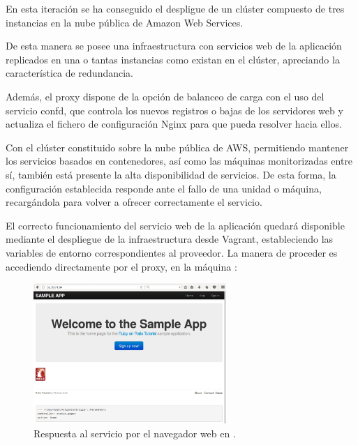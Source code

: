 En esta iteración se ha conseguido el despligue de un clúster compuesto de tres instancias en la nube pública de Amazon Web Services.

De esta manera se posee una infraestructura con servicios web de la aplicación replicados en una o tantas instancias como existan en el clúster, apreciando la característica de redundancia. 

Además, el proxy dispone de la opción de balanceo de carga con el uso del servicio confd, que controla los nuevos registros o bajas de los servidores web y actualiza el fichero de configuración Nginx para que pueda resolver hacia ellos. 

Con el clúster constituido sobre la nube pública de AWS, permitiendo mantener los servicios basados en contenedores, así como las máquinas monitorizadas entre sí, también está presente la alta disponibilidad de servicios. De esta forma, la configuración establecida responde ante el fallo de una unidad o máquina, recargándola para volver a ofrecer correctamente el servicio.

El correcto funcionamiento del servicio web de la aplicación quedará disponible mediante el despliegue de la infraestructura desde Vagrant, estableciendo las variables de entorno correspondientes al proveedor. La manera de proceder es accediendo directamente por el proxy, en la máquina :


\begin{figure}[H]
\centering
\includegraphics[width=0.65\textwidth]{images/figures/web-confd.png}
\caption{Respuesta al servicio por el navegador web en .}
\end{figure}

